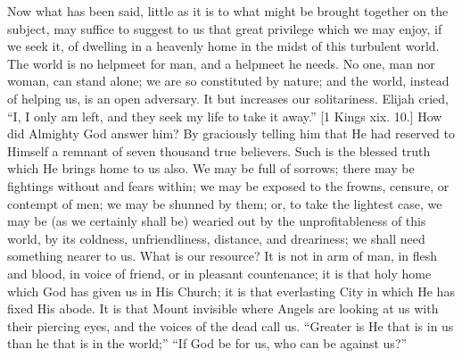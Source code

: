 Now what has been said, little as it is to what might be brought
together on the subject, may suffice to suggest to us that great
privilege which we may enjoy, if we seek it, of dwelling in a heavenly
home in the midst of this turbulent world. The world is no helpmeet
for man, and a helpmeet he needs. No one, man nor woman, can stand
alone; we are so constituted by nature; and the world, instead of
helping us, is an open adversary. It but increases our solitariness.
Elijah cried, ``I, I only am left, and they seek my life to take
it away.'' [1 Kings xix. 10.] How did Almighty God answer him? By
graciously telling him that He had reserved to Himself a remnant of
seven thousand true believers. Such is the blessed truth which He
brings home to us also. We may be full of sorrows; there may be
fightings without and fears within; we may be exposed to the frowns,
censure, or contempt of men; we may be shunned by them; or, to take
the lightest case, we may be (as we certainly shall be) wearied out by
the unprofitableness of this world, by its coldness, unfriendliness,
distance, and dreariness; we shall need something nearer to us. What
is our resource? It is not in arm of man, in flesh and blood, in voice
of friend, or in pleasant countenance; it is that holy home which God
has given us in His Church; it is that everlasting City in which He
has fixed His abode. It is that Mount invisible where Angels are
looking at us with their piercing eyes, and the voices of the dead
call us. ``Greater is He that is in us than he that is in the
world;'' ``If God be for us, who can be against us?''

